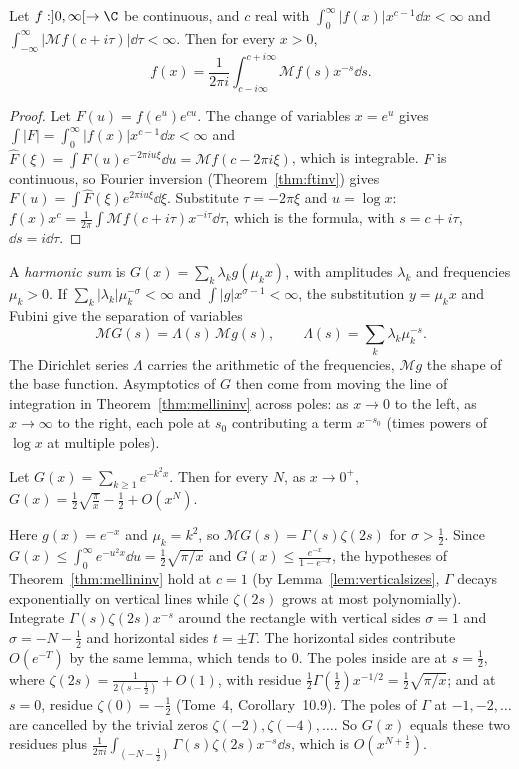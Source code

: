 \begin{theorem}\label{thm:mellininv}
Let $f:]0,\infty[\to\C$ be continuous, and $c$ real with $\int_0^\infty|f(x)|x^{c-1}\dd x<\infty$ and $\int_{-\infty}^\infty|\mathcal Mf(c+i\tau)|\dd\tau<\infty$. Then for every $x>0$,
\[
f(x)=\frac1{2\pi i}\int_{c-i\infty}^{c+i\infty}\mathcal Mf(s)x^{-s}\dd s.
\]
\end{theorem}
\begin{proof}
Let $F(u)=f(e^u)e^{cu}$. The change of variables $x=e^u$ gives $\int|F|=\int_0^\infty|f(x)|x^{c-1}\dd x<\infty$ and $\hat F(\xi)=\int F(u)e^{-2\pi iu\xi}\dd u=\mathcal Mf(c-2\pi i\xi)$, which is integrable. $F$ is continuous, so
Fourier inversion (Theorem~\ref{thm:ftinv}) gives $F(u)=\int\hat F(\xi)e^{2\pi iu\xi}\dd\xi$. Substitute $\tau=-2\pi\xi$ and $u=\log x$: $f(x)x^c=\frac1{2\pi}\int\mathcal Mf(c+i\tau)x^{-i\tau}\dd\tau$, which is the
formula, with $s=c+i\tau$, $\dd s=i\dd\tau$.
\end{proof}

A \emph{harmonic sum} is $G(x)=\sum_k\lambda_kg(\mu_kx)$, with amplitudes $\lambda_k$ and frequencies $\mu_k>0$. If $\sum_k|\lambda_k|\mu_k^{-\sigma}<\infty$ and $\int|g|x^{\sigma-1}<\infty$, the substitution $y=\mu_kx$ and
Fubini give the separation of variables
\begin{equation}\label{eq:harmonicsum}
\mathcal MG(s)=\Lambda(s)\,\mathcal Mg(s),\qquad\Lambda(s)=\sum_k\lambda_k\mu_k^{-s}.
\end{equation}
The Dirichlet series $\Lambda$ carries the arithmetic of the frequencies, $\mathcal Mg$ the shape of the base function. Asymptotics of $G$ then come from moving the line of integration in
Theorem~\ref{thm:mellininv} across poles: as $x\to0$ to the left, as $x\to\infty$ to the right, each pole at $s_0$ contributing a term $x^{-s_0}$ (times powers of $\log x$ at multiple poles).

\begin{example}\label{ex:thetamellin}
Let $G(x)=\sum_{k\ge1}e^{-k^2x}$. Then for every $N$, as $x\to0^+$, $G(x)=\frac12\sqrt{\frac\pi x}-\frac12+O(x^N)$.

Here $g(x)=e^{-x}$ and $\mu_k=k^2$, so $\mathcal MG(s)=\Gamma(s)\zeta(2s)$ for $\sigma>\frac12$. Since $G(x)\le\int_0^\infty e^{-u^2x}\dd u=\frac12\sqrt{\pi/x}$ and $G(x)\le\frac{e^{-x}}{1-e^{-x}}$, the hypotheses of
Theorem~\ref{thm:mellininv} hold at $c=1$ (by Lemma~\ref{lem:verticalsizes}, $\Gamma$ decays exponentially on vertical lines while $\zeta(2s)$ grows at most polynomially). Integrate $\Gamma(s)\zeta(2s)x^{-s}$ around the
rectangle with vertical sides $\sigma=1$ and $\sigma=-N-\frac12$ and horizontal sides $t=\pm T$. The horizontal sides contribute $O(e^{-T})$ by the same lemma, which tends to $0$. The poles inside are at
$s=\frac12$, where $\zeta(2s)=\frac1{2(s-\frac12)}+O(1)$, with residue $\frac12\Gamma(\frac12)x^{-1/2}=\frac12\sqrt{\pi/x}$; and at $s=0$, residue $\zeta(0)=-\frac12$ (Tome~4, Corollary~10.9). The poles of $\Gamma$ at
$-1,-2,\dots$ are cancelled by the trivial zeros $\zeta(-2),\zeta(-4),\dots$. So $G(x)$ equals these two residues plus $\frac1{2\pi i}\int_{(-N-\frac12)}\Gamma(s)\zeta(2s)x^{-s}\dd s$, which is $O(x^{N+\frac12})$.
\end{example}

